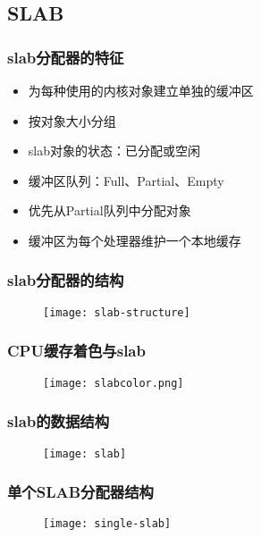 \subsection{SLAB} %
\begin{frame}[plain,t]    
    \frametitle{slab分配器的特征}
    \begin{itemize}
        \item 为每种使用的内核对象建立单独的缓冲区
        \item 按对象大小分组
        \item slab对象的状态：已分配或空闲
        \item 缓冲区队列：Full、Partial、Empty
        \item 优先从Partial队列中分配对象
        \item 缓冲区为每个处理器维护一个本地缓存
    \end{itemize}
\end{frame}
\begin{frame}[plain,t]    
    \frametitle{slab分配器的结构}
    \begin{figure}
        \centering
        \texttt{[image: slab-structure]}
    \end{figure}
\end{frame}
\begin{frame}[plain,t]    
    \frametitle{CPU缓存着色与slab}
    \begin{figure}
        \centering
        \texttt{[image: slabcolor.png]}
    \end{figure}
\end{frame}
\begin{frame}[plain,t]    
    \frametitle{slab的数据结构}
    \begin{figure}
        \centering
        \texttt{[image: slab]}
    \end{figure}
\end{frame}
\begin{frame}[plain,t]    
    \frametitle{单个SLAB分配器结构}
    \begin{figure}
        \centering
        \texttt{[image: single-slab]}
    \end{figure}
\end{frame}
